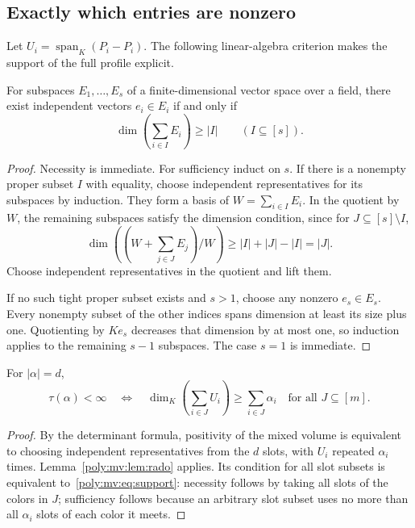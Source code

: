 \documentclass[11pt,a4paper]{article}
\numberwithin{equation}{section}
\theoremstyle{plain}
\newcommand{\R}{\mathbb R}
\newcommand{\Span}{\operatorname{span}_{\R}}%
\newcommand{\spanplain}{\operatorname{span}}%
\begin{document}
\subsection{Exactly which entries are nonzero}
Let $U_i=\spanplain_K(P_i-P_i)$. The following linear-algebra criterion makes
the support of the full profile explicit.

\begin{lemma}
\label{poly:mv:lem:rado}
For subspaces $E_1,\ldots,E_s$ of a finite-dimensional vector space over
a field, there exist independent vectors $e_i\in E_i$ if and only if
\[
 \dim\left(\sum_{i\in I}E_i\right)\ge|I|
 \qquad(I\subseteq[s]).
\]
\end{lemma}
\begin{proof}
Necessity is immediate. For sufficiency induct on $s$. If there is a
nonempty proper subset $I$ with equality, choose independent
representatives for its subspaces by induction. They form a basis of
$W=\sum_{i\in I}E_i$. In the quotient by $W$, the remaining subspaces
satisfy the dimension condition, since for $J\subseteq[s]\setminus I$,
\[
 \dim\left((W+\sum_{j\in J}E_j)/W\right)
 \ge |I|+|J|-|I|=|J|.
\]
Choose independent representatives in the quotient and lift them.

If no such tight proper subset exists and $s>1$, choose any nonzero
$e_s\in E_s$. Every nonempty subset of the other indices spans dimension
at least its size plus one. Quotienting by $Ke_s$ decreases that dimension
by at most one, so induction applies to the remaining $s-1$ subspaces.
The case $s=1$ is immediate.
\end{proof}

\begin{corollary}
\label{poly:mv:cor:support}
For $|\alpha|=d$,
\begin{equation}
\label{poly:mv:eq:support}
 \tau(\alpha)<\infty
 \quad\Longleftrightarrow\quad
 \dim_K\left(\sum_{i\in J}U_i\right)
       \ge\sum_{i\in J}\alpha_i
 \quad\text{for all }J\subseteq[m].
\end{equation}
\end{corollary}
\begin{proof}
By the determinant formula, positivity of the mixed volume is equivalent
to choosing independent representatives from the $d$ slots, with $U_i$
repeated $\alpha_i$ times. Lemma~\ref{poly:mv:lem:rado} applies. Its condition for
all slot subsets is equivalent to~\eqref{poly:mv:eq:support}: necessity follows
by taking all slots of the colors in $J$; sufficiency follows because an
arbitrary slot subset uses no more than all $\alpha_i$ slots of each
color it meets.
\end{proof}
\end{document}
